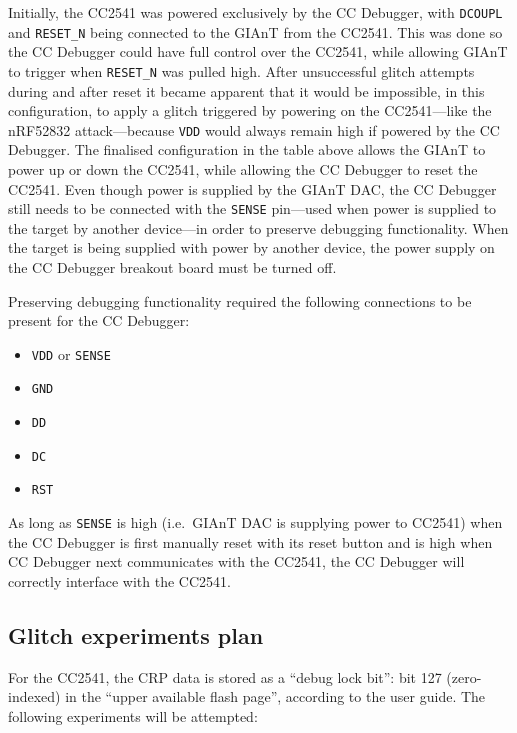 Initially, the CC2541 was powered exclusively by the CC Debugger, with
\texttt{DCOUPL} and \texttt{RESET\_N} being connected to the GIAnT from
the CC2541. This was done so the CC Debugger could have full control
over the CC2541, while allowing GIAnT to trigger when \texttt{RESET\_N}
was pulled high. After unsuccessful glitch attempts during and after
reset it became apparent that it would be impossible, in this
configuration, to apply a glitch triggered by powering on the
CC2541---like the nRF52832 attack---because \texttt{VDD} would always
remain high if powered by the CC Debugger. The finalised configuration
in the table above allows the GIAnT to power up or down the CC2541,
while allowing the CC Debugger to reset the CC2541. Even though power is
supplied by the GIAnT DAC, the CC Debugger still needs to be connected
with the \texttt{SENSE} pin---used when power is supplied to the target
by another device---in order to preserve debugging functionality. When
the target is being supplied with power by another device, the power
supply on the CC Debugger breakout board must be turned off.

Preserving debugging functionality required the following connections to
be present for the CC Debugger:

\begin{itemize}
\tightlist
\item
  \texttt{VDD} or \texttt{SENSE}
\item
  \texttt{GND}
\item
  \texttt{DD}
\item
  \texttt{DC}
\item
  \texttt{RST}
\end{itemize}

As long as \texttt{SENSE} is high (i.e.~GIAnT DAC is supplying power to
CC2541) when the CC Debugger is first manually reset with its reset
button and is high when CC Debugger next communicates with the CC2541,
the CC Debugger will correctly interface with the CC2541.

\hypertarget{glitch-experiments-plan}{%
\subsection{Glitch experiments plan}\label{glitch-experiments-plan}}

For the CC2541, the CRP data is stored as a ``debug lock bit'': bit 127
(zero-indexed) in the ``upper available flash page'', according to the
user guide. The following experiments will be attempted:

